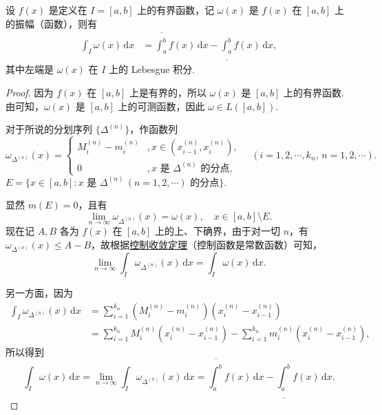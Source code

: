 \documentclass[../../main.tex]{subfiles}
\begin{document}
\begin{lemma}\label{lemma:引理4.23}
设 \( f(x) \) 是定义在 \( I = [a,b] \) 上的有界函数，记 \( \omega(x) \) 是 \( f(x) \) 在 \( [a,b] \) 上的振幅（函数），则有
\begin{align*}
\int_I \omega(x) \, \mathrm{d}x &= \overline{\int_a^b} f(x) \, \mathrm{d}x - \underline{\int_a^b} f(x) \, \mathrm{d}x,
\end{align*}
其中左端是 \( \omega(x) \) 在 \( I \) 上的 Lebesgue 积分.
\end{lemma}
\begin{proof}
因为 \( f(x) \) 在 \( [a,b] \) 上是有界的，所以 \( \omega(x) \) 是 \( [a,b] \) 上的有界函数. 由可知，\( \omega(x) \) 是 \( [a,b] \) 上的可测函数，因此 \( \omega \in L([a,b]) \).

对于所说的分划序列 \( \{\Delta^{(n)}\} \)，作函数列
\[
\omega_{\Delta^{(n)}}(x) = 
\begin{cases} 
M_i^{(n)} - m_i^{(n)} &, x \in (x_{i-1}^{(n)}, x_i^{(n)}), \\
0 & ,x \text{ 是 } \Delta^{(n)} \text{ 的分点},
\end{cases}
\quad (i = 1,2,\cdots,k_n,\, n = 1,2,\cdots).
\]
\( E = \{ x \in [a,b] : x \text{ 是 } \Delta^{(n)} \, (n = 1,2,\cdots) \text{ 的分点} \} \).

显然 \( m(E) = 0 \)，且有
\[
\lim_{n \to \infty} \omega_{\Delta^{(n)}}(x) = \omega(x), \quad x \in [a,b] \setminus E.
\]
现在记 \( A,B \) 各为 \( f(x) \) 在 \( [a,b] \) 上的上、下确界，由于对一切 \( n \)，有 \( \omega_{\Delta^{(n)}}(x) \leq A - B \)，故根据\hyperref[theorem:控制收敛定理]{控制收敛定理}（控制函数是常数函数）可知，
\[
\lim_{n \to \infty} \int_I \omega_{\Delta^{(n)}}(x) \, \mathrm{d}x = \int_I \omega(x) \, \mathrm{d}x.
\]

另一方面，因为
\begin{align*}
\int_I \omega_{\Delta^{(n)}}(x) \, \mathrm{d}x &= \sum_{i=1}^{k_n} (M_i^{(n)} - m_i^{(n)})(x_i^{(n)} - x_{i-1}^{(n)}) \\
&= \sum_{i=1}^{k_n} M_i^{(n)}(x_i^{(n)} - x_{i-1}^{(n)}) - \sum_{i=1}^{k_n} m_i^{(n)}(x_i^{(n)} - x_{i-1}^{(n)}),
\end{align*}
所以得到
\[
\int_I \omega(x) \, \mathrm{d}x = \lim_{n \to \infty} \int_I \omega_{\Delta^{(n)}}(x) \, \mathrm{d}x = \overline{\int_a^b} f(x) \, \mathrm{d}x - \underline{\int_a^b} f(x) \, \mathrm{d}x.
\]
\end{proof}
\end{document}
